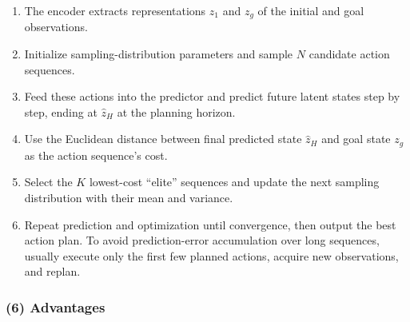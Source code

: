 \begin{enumerate}
\def\labelenumi{\arabic{enumi}.}
\tightlist
\item
  The encoder extracts representations \(z_1\) and \(z_g\) of the initial and goal observations.
\item
  Initialize sampling-distribution parameters and sample \(N\) candidate action sequences.
\item
  Feed these actions into the predictor and predict future latent states step by step, ending at \(\hat{z}_H\) at the planning horizon.
\item
  Use the Euclidean distance between final predicted state \(\hat{z}_H\) and goal state \(z_g\) as the action sequence's cost.
\item
  Select the \(K\) lowest-cost ``elite'' sequences and update the next sampling distribution with their mean and variance.
\item
  Repeat prediction and optimization until convergence, then output the best action plan. To avoid prediction-error accumulation over long sequences, usually execute only the first few planned actions, acquire new observations, and replan.
\end{enumerate}

\hypertarget{advantages}{%
\subsubsection{(6) Advantages}\label{advantages}}

